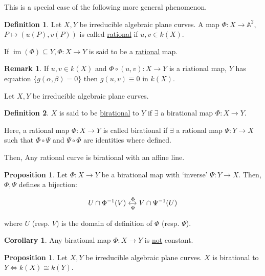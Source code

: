 \documentclass{article}
\theoremstyle{definition}
\newtheorem*{definition}{Definition}
\newtheorem{proposition}[theorem]{Proposition}
\newtheorem{corollary}[theorem]{Corollary}
\newtheorem*{remark}{Remark}
\begin{document}
        This is a special case of the following more general phenomenon.

        \begin{definition}
            Let \(X,Y\) be irreducible algebraic plane curves. A map \(\Phi: X \to \mathbb{A}^2\), \(P \mapsto (u(P),v(P))\) is called \underline{rational} if \(u,v\in k(X)\).

            If \(\operatorname{im} (\Phi) \subseteq Y, \Phi: X \to Y\) is said to be a \underline{rational} map.

            \begin{remark}
                If \(u,v \in k(X)\) and \(\Phi \circ (u,v): X \to Y\) is a riational map, \(Y\) has equation \(\{ g(\alpha ,\beta) = 0\} \) then \(g(u,v) \equiv 0\) in \(k(X)\). 
            \end{remark}
        \end{definition}

        Let \(X,Y\) be irreducible algebraic plane curves.

        \begin{definition}
            \(X\) is said to be \underline{birational} to \(Y\) if \(\exists \) a birational map \(\Phi : X \to Y\).
            
            Here, a rational map \(\Phi: X \to Y\) is called birational if \(\exists\) a rational map \(\Psi: Y \to X\) such that \(\Phi \circ \Psi\) and \(\Psi \circ \Phi\) are identities where defined.
        \end{definition}

        Then, Any rational curve is birational with an affine line.

        \begin{proposition}
            Let \(\Phi : X \to Y\) be a birational map with `inverse' \(\Psi : Y \to X\). Then, \(\Phi ,  \Psi\) defines a bijection:

            \[
                U \cap \Phi ^{-1} (V) \xleftrightarrow[\Psi]{\Phi}  V \cap \Psi ^{-1} (U)
            \]

            where \(U\) (resp. \(V\)) is the domain of definition of \(\Phi\) (resp. \(\Psi\)).
        \end{proposition}

        \begin{corollary}
            Any birational map \(\Phi: X \to Y\) is \underline{not} constant.
        \end{corollary}

        \begin{proposition}
            Let \(X,Y\) be irreducible algebraic plane curves. \(X\) is birational to \(Y \iff k(X) \cong k(Y)\).
        \end{proposition}
\end{document}
